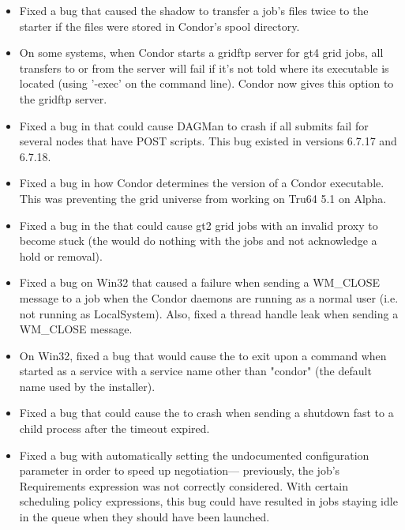 \begin{itemize}
\item Fixed a bug that caused the shadow to transfer a job's files
twice to the starter if the files were stored in Condor's spool
directory.

\item On some systems, when Condor starts a gridftp server for gt4 grid
jobs, all transfers to or from the server will fail if it's not told
where its executable is located (using '-exec' on the command line).
Condor now gives this option to the gridftp server.

\item Fixed a bug in  that could cause DAGMan to crash
if all submits fail for several nodes that have POST scripts.
This bug existed in versions 6.7.17 and 6.7.18.

\item Fixed a bug in how Condor determines the version of a Condor
executable. This was preventing the grid universe from working on
Tru64 5.1 on Alpha.

\item Fixed a bug in the  that could cause gt2 grid
jobs with an invalid proxy to become stuck (the 
would do nothing with the jobs and not acknowledge a hold or removal).

\item Fixed a bug on Win32 that caused a failure when sending a WM\_CLOSE
message to a job when the Condor daemons are running as a normal user (i.e. not
running as LocalSystem).  Also, fixed a thread handle leak when sending a
WM\_CLOSE message.

\item On Win32, fixed a bug that would cause the  to exit upon a
 command when started as a service with
a service name other than "condor" (the default name used by the installer).

\item Fixed a bug that could cause the  to crash when
sending a shutdown fast to a child process after the 
 timeout expired.


\item Fixed a bug with automatically setting the undocumented
 configuration parameter in order to 
speed up negotiation--- previously, the job's Requirements
expression was not correctly considered.  With certain scheduling policy
expressions, this bug could have resulted in jobs staying idle in the
queue when they should have been launched.


\end{itemize}

